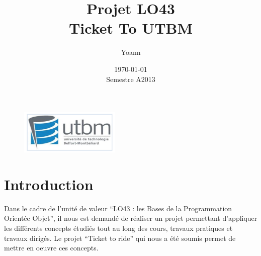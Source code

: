 \documentclass{report}
\begin{document}
\begin{figure}[!p!t]
\includegraphics[height=60pt]{utbm.png}
\end{figure}

\title{Projet LO43\\ \huge{\textbf{Ticket To UTBM}}}
\author{Yoann }
\date{\today \\Semestre A2013}



\maketitle \clearpage
\tableofcontents %

\chapter{Introduction}
Dans  le  cadre  de  l’unité  de  valeur  “LO43  : les  Bases de  la Programmation Orientée  Objet”,  il   nous  est  demandé  de  réaliser  un  projet  permettant d’appliquer  les  différents  concepts  étudiés  tout  au  long  des  cours,  travaux pratiques et travaux dirigés.
Le projet “Ticket to ride” qui nous a été soumis permet de mettre en oeuvre ces concepts.
\end{document}
